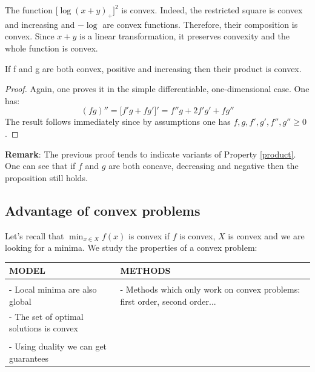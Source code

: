 \begin{example}
\begin{leftbar}
The function $\big[ \log(x+y)_+\big]^2$ is convex. Indeed, the restricted square is convex and increasing and $-\log$ are convex functions. Therefore, their composition is convex. Since $x+y$ is a linear transformation, it preserves convexity and the whole function is convex. 
\end{leftbar}
\end{example}
\vspace{0.5cm}
\begin{property}\label{product}
If f and g are both convex, positive and increasing then their product is convex.
\end{property}
\begin{proof}
Again, one proves it in the simple differentiable, one-dimensional case. 
One has:
$$(fg)'' = \big[ f'g + fg'\big]' = f''g + 2f'g'+fg''$$
The result follows immediately since by assumptions one has $f,g,f',g',f'',g'' \geq 0$.  
\end{proof}
\textbf{Remark}: The previous proof tends to indicate variants of Property \ref{product}. One can see that if $f$ and $g$ are both concave, decreasing and negative then the proposition still holds.  

\subsection{Advantage of convex problems}
\begin{property}
Let's recall that $ \min_{x \in X} f(x)$ is convex if $f$ is convex, $X$ is convex and we are looking for a minima. We study the properties of a convex problem:
\vspace{0.5cm}
\begin{center}
 \begin{tabular}{p{7cm}|p{7cm}} 
    MODEL & METHODS \\
    \hline
	  & \\
  - Local minima are also global & - Methods which only work on convex problems: first order, second order...  \\
   - The set of optimal solutions is convex & \\
	& \\
    - Using duality we can get guarantees & \\
 \end{tabular}
 \end{center}

 \end{property}
